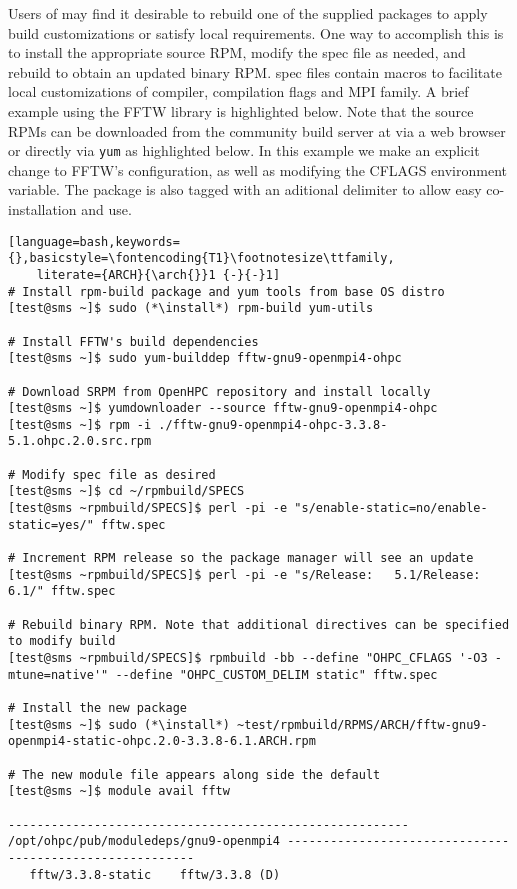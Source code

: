 Users of \OHPC{} may find it desirable to rebuild one of the supplied packages
to apply build customizations or satisfy local requirements. One way to
accomplish this is to install the appropriate source RPM, modify the spec file
as needed, and rebuild to obtain an updated binary RPM. \OHPC{} spec files
contain macros to facilitate local customizations of compiler, compilation
flags and MPI family. A brief example using
the FFTW library is highlighted below.  Note that the source RPMs can be downloaded from the
community build server at \href{https://build.openhpc.community}
{\color{blue}{https://build.openhpc.community}} via a web browser or directly
via \texttt{yum} as highlighted below. In this example we make an explicit
change to FFTW's configuration, as well as modifying the CFLAGS environment
variable. The package is also tagged with an aditional delimiter to allow easy
co-installation and use. 

\begin{lstlisting}[language=bash,keywords={},basicstyle=\fontencoding{T1}\footnotesize\ttfamily,
    literate={ARCH}{\arch{}}1 {-}{-}1]
# Install rpm-build package and yum tools from base OS distro
[test@sms ~]$ sudo (*\install*) rpm-build yum-utils

# Install FFTW's build dependencies
[test@sms ~]$ sudo yum-builddep fftw-gnu9-openmpi4-ohpc

# Download SRPM from OpenHPC repository and install locally
[test@sms ~]$ yumdownloader --source fftw-gnu9-openmpi4-ohpc
[test@sms ~]$ rpm -i ./fftw-gnu9-openmpi4-ohpc-3.3.8-5.1.ohpc.2.0.src.rpm

# Modify spec file as desired
[test@sms ~]$ cd ~/rpmbuild/SPECS
[test@sms ~rpmbuild/SPECS]$ perl -pi -e "s/enable-static=no/enable-static=yes/" fftw.spec

# Increment RPM release so the package manager will see an update
[test@sms ~rpmbuild/SPECS]$ perl -pi -e "s/Release:   5.1/Release:   6.1/" fftw.spec

# Rebuild binary RPM. Note that additional directives can be specified to modify build
[test@sms ~rpmbuild/SPECS]$ rpmbuild -bb --define "OHPC_CFLAGS '-O3 -mtune=native'" --define "OHPC_CUSTOM_DELIM static" fftw.spec

# Install the new package
[test@sms ~]$ sudo (*\install*) ~test/rpmbuild/RPMS/ARCH/fftw-gnu9-openmpi4-static-ohpc.2.0-3.3.8-6.1.ARCH.rpm

# The new module file appears along side the default
[test@sms ~]$ module avail fftw

-------------------------------------------------------- /opt/ohpc/pub/moduledeps/gnu9-openmpi4 ---------------------------------------------------------
   fftw/3.3.8-static    fftw/3.3.8 (D)
\end{lstlisting}
